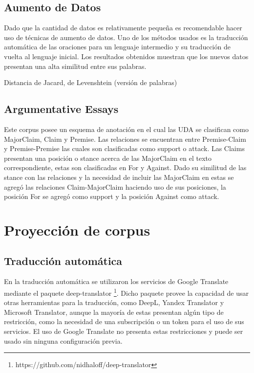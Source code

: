 \subsection{Aumento de Datos}

Dado que la cantidad de datos es relativamente pequeña es recomendable hacer uso de técnicas de 
aumento de datos. Uno de los métodos usados es la traducción automática de las oraciones para 
un lenguaje intermedio y su traducción de vuelta al lenguaje inicial. Los resultados obtenidos
muestran que los nuevos datos presentan una alta similitud entre sus palabras.

Distancia de Jacard, de Levenshtein (versión de palabras)


\cite{feng2021data}

\subsection{Argumentative Essays}

Este corpus posee un esquema de anotación en el cual las UDA se clasifican como MajorClaim, Claim y 
Premise. Las relaciones se encuentran entre Premise-Claim y Premise-Premise las cuales son clasificadas
como support o attack. Las Claims presentan una posición o stance acerca de las MajorClaim en el 
texto correspondiente, estas son clasificadas en For y Against. Dado su similitud de las stance con
las relaciones y la necesidad de incluir las MajorClaim en estas se agregó las relaciones Claim-MajorClaim
haciendo uso de sus posiciones, la posición For se agregó como support y la posición Against como attack.

\section{Proyección de corpus}

\subsection{Traducción automática}

En la traducción automática se utilizaron los servicios de Google Translate mediante el paquete
deep-translator \footnote{https://github.com/nidhaloff/deep-translator}. Dicho paquete provee la capacidad de usar 
otras herramientas para la traducción, como DeepL, Yandex Translator y Microsoft Translator,
aunque la mayoría de estas presentan algún tipo de restricción, como la necesidad de una subscripción
o un token para el uso de sus servicios. El uso de Google Translate no presenta estas restricciones
y puede ser usado sin ninguna configuración previa.

